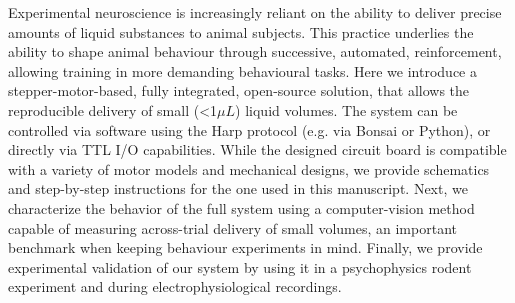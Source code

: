 Experimental neuroscience is increasingly reliant on the ability to deliver precise amounts of liquid substances to animal subjects. This practice underlies the ability to shape animal behaviour through successive, automated, reinforcement, allowing training in more demanding behavioural tasks. 
Here we introduce a stepper-motor-based, fully integrated, open-source solution, that allows the reproducible delivery of small (<1$\mu L$) liquid volumes.
The system can be controlled via software using the Harp protocol (e.g. via Bonsai or Python), or directly via TTL I/O capabilities. While the designed circuit board is compatible with a variety of motor models and mechanical designs, we provide schematics and step-by-step instructions for the one used in this manuscript.
Next, we characterize the behavior of the full system using a computer-vision method capable of measuring across-trial delivery of small volumes, an important benchmark when keeping behaviour experiments in mind. Finally, we provide experimental validation of our system by using it in a psychophysics rodent experiment and during electrophysiological recordings.
